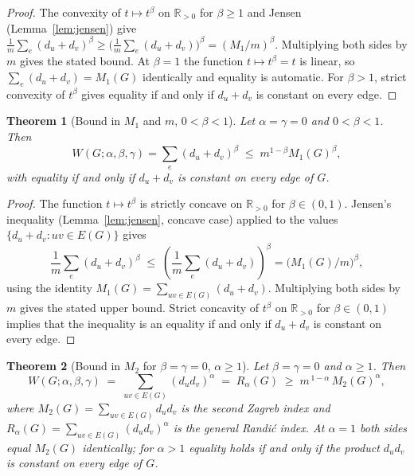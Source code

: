 \documentclass[11pt,a4paper]{article}
\newtheorem{theorem}{Theorem}[section]
\theoremstyle{definition}
\newcommand{\Wuzi}{W(G;\alpha,\beta,\gamma)}
\begin{document}
\begin{proof}
The convexity of $t\mapsto t^\beta$ on $\mathbb{R}_{>0}$ for
$\beta\ge 1$ and Jensen (Lemma~\ref{lem:jensen}) give
$\frac{1}{m}\sum_e(d_u+d_v)^\beta\ge
\bigl(\frac{1}{m}\sum_e(d_u+d_v)\bigr)^\beta=(M_1/m)^\beta$.
Multiplying both sides by $m$ gives the stated bound. At
$\beta = 1$ the function $t \mapsto t^\beta = t$ is linear, so
$\sum_e (d_u + d_v) = M_1(G)$ identically and equality is
automatic. For $\beta > 1$, strict convexity of $t^\beta$ gives
equality if and only if $d_u + d_v$ is constant on every edge.
\end{proof}

\begin{theorem}[Bound in $M_1$ and $m$, $0<\beta<1$]
\label{thm:m1_concave}
Let $\alpha=\gamma=0$ and $0<\beta<1$. Then
\[
\Wuzi=\sum_{e}(d_u+d_v)^{\beta}\;\le\; m^{1-\beta}M_1(G)^{\beta},
\]
with equality if and only if $d_u + d_v$ is constant on every edge
of $G$.
\end{theorem}

\begin{proof}
The function $t \mapsto t^\beta$ is strictly concave on
$\mathbb{R}_{>0}$ for $\beta \in (0, 1)$. Jensen's inequality
(Lemma~\ref{lem:jensen}, concave case) applied to the values
$\{d_u + d_v : uv \in E(G)\}$ gives
\[
\frac{1}{m} \sum_e (d_u + d_v)^\beta
\;\le\;
\left( \frac{1}{m} \sum_e (d_u + d_v) \right)^{\!\beta}
= \bigl( M_1(G) / m \bigr)^{\beta},
\]
using the identity $M_1(G) = \sum_{uv \in E(G)} (d_u + d_v)$.
Multiplying both sides by $m$ gives the stated upper bound.
Strict concavity of $t^\beta$ on $\mathbb{R}_{>0}$ for
$\beta \in (0, 1)$ implies that the inequality is an equality if
and only if $d_u + d_v$ is constant on every edge.
\end{proof}

\begin{theorem}[Bound in $M_2$ for $\beta=\gamma=0$, $\alpha\ge 1$]
\label{thm:m2_alpha}
Let $\beta=\gamma=0$ and $\alpha\ge 1$. Then
\[
\Wuzi
\;=\; \sum_{uv\in E(G)}(d_u d_v)^{\alpha}
\;=\; R_{\alpha}(G)
\;\ge\; m^{\,1-\alpha}\,M_{2}(G)^{\alpha},
\]
where $M_{2}(G)=\sum_{uv\in E(G)} d_u d_v$ is the second Zagreb index
and $R_{\alpha}(G)=\sum_{uv\in E(G)}(d_u d_v)^{\alpha}$ is the general
Randi\'c index. At $\alpha=1$ both sides equal $M_{2}(G)$ identically;
for $\alpha>1$ equality holds if and only if the product $d_u d_v$
is constant on every edge of $G$.
\end{theorem}
\end{document}
